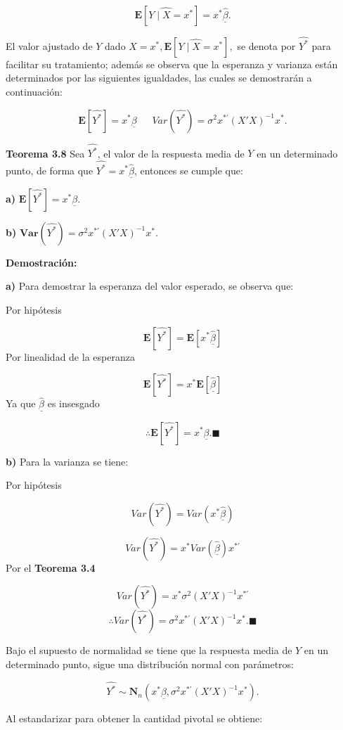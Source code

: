 \documentclass[
  a4paper,
  oneside,
  openany]{book}
\begin{document}
\[\mathbf{E}\left[\widehat{Y \mid X =} x^*\right]=x^*\underline{\hat{\beta}}.\]

El valor ajustado de \(Y\) dado \(X=x^*,\mathbf{E}\left[ \widehat{Y \mid X=} x^*\right],\) se denota por \(\hat{Y^*}\) para facilitar su tratamiento; además se observa que la esperanza y varianza están determinados por las siguientes igualdades, las cuales se demostrarán a continuación:

\[\mathbf{E}[\hat{Y^*}]= x^*\underline{\beta} \ \ \ \ \ \ \ Var(\hat{Y^*})=\sigma^2 x^{*'}(X'X)^{-1}x^*.\]

\textbf{Teorema 3.8} Sea \(\hat{Y^*}\), el valor de la respuesta media de \(Y\) en un determinado punto, de forma que \(\hat{Y^*}=x^*\underline{\hat{\beta}}\), entonces se cumple que:

\textbf{a)} \(\mathbf{E}[\hat{Y^*}]= x^*\underline{\beta}.\)

\textbf{b)} \(\textbf{Var}(\hat{Y^*})=\sigma^2 x^{*'}(X'X)^{-1}x^*.\)

\textbf{Demostración:}

\textbf{a)} Para demostrar la esperanza del valor esperado, se observa que:

Por hipótesis

\[\mathbf{E}[\hat{Y^*}]=\mathbf{E}[x^*\underline{\hat{\beta}}]\]
Por linealidad de la esperanza

\[\mathbf{E}[\hat{Y^*}]=x^*\mathbf{E}[\underline{\hat{\beta}}]\]
Ya que \(\underline{\hat{\beta}}\) es insesgado

\[\therefore \mathbf{E}[\hat{Y^*}]= x^*\underline{\beta}.\blacksquare\]

\textbf{b)} Para la varianza se tiene:

Por hipótesis

\[Var(\hat{Y^*})=Var(x^*\underline{\hat{\beta}})\]

\[Var(\hat{Y^*})=x^*Var(\underline{\hat{\beta}})x^{*'}\]
Por el \textbf{Teorema 3.4}

\[Var(\hat{Y^*})=x^*\sigma^2(X'X)^{-1}x^{*'}\]
\[\therefore Var(\hat{Y^*})=\sigma^2 x^{*'}(X'X)^{-1}x^*.\blacksquare\]

Bajo el supuesto de normalidad se tiene que la respuesta media de \(Y\) en un determinado punto, sigue una distribución normal con parámetros:

\[\hat{Y^*} \sim \mathbf{N}_{n}\left(x^*\underline{\beta} ,\sigma^2 x^{*'}(X'X)^{-1}x^*\right).\]

Al estandarizar para obtener la cantidad pivotal se obtiene:
\end{document}
